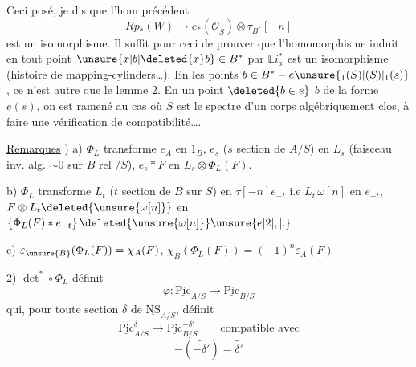 Ceci posé, je dis que l'hom précédent
\[
Rp_*(W)\longrightarrow e_*(\underline{\mathcal O}_S)\otimes\tau_{B^*}[-n]
\]
est un isomorphisme. Il suffit pour ceci de prouver que l'homomorphisme induit  en tout point $\unsure{x|b|\deleted{x}b}\in B^*$ par $\mathbb{L} i_x^*$ est un isomorphisme (histoire de mapping-cylinders\ldots). En les points $b\in B^*-e\unsure{_1(S)|(S)|_1(s)}$, ce n'est autre que le lemme 2. En un point $\deleted{b\in e}$ $b$ de la forme $e(s)$, on est ramené au cas où $S$ est le spectre d'un corps algébriquement clos, à faire une vérification de compatibilité\ldots.

\uline{Remarques} ) a) $\Phi_L$ transforme $e_A$ en $1_B$, $e_s$ ($s$ section de $A/S$) en $L_s$ (faisceau inv. alg. $\sim0$ sur $B$ rel $/S$),  $e_s*F$ en $L_s\otimes\Phi_L(F)$.

b) $\Phi_L$ transforme  $L_t$ ($t$ section de $B$ sur $S$) en $\tau[-n]e_{-t}$ i.e $L_t\,\omega[n]$ en $e_{-t}$,  $F\otimes L_t\deleted{\unsure{\omega[n]}}$ en $\left\{\Phi_L(F)*e_{-t}\right\}\deleted{\unsure{\omega[n]}}\unsure{e|2|,|.}$

c) $\varepsilon_{\unsure{B}}(\Phi_L(F))=\chi_A(F)$, $\chi_B(\Phi_L(F))=(-1)^n\varepsilon_A(F)$

2) $\det^*\circ\Phi_L$ définit 
\[
\varphi\colon\underline{\mathrm{Pic}}_{A/S}\longrightarrow\underline{\mathrm{Pic}}_{B/S}
\]
qui, pour toute section $\delta$ de $\underline{\mathrm{NS}}_{A/S}$, définit
\[
\underline{\mathrm{Pic}}^\delta_{A/S}\longrightarrow\underline{\mathrm{Pic}}^{-\delta'}_{B/S}\qquad\text{compatible avec}
\]
\[
-(\widetilde{-\delta'})=\widetilde{\delta'}
\]
